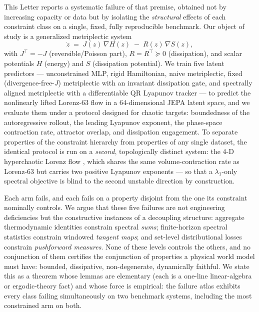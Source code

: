 \documentclass[journal]{IEEEtran}
\newcommand{\grad}{\nabla}
\begin{document}
This Letter reports a systematic failure of that premise, obtained not by
increasing capacity or data but by isolating the \emph{structural} effects
of each constraint class on a single, fixed, fully reproducible benchmark.
Our object of study is a generalized metriplectic system
\begin{equation}
\label{eq:metriplectic}
\dot z \;=\; J(z)\,\grad H(z) \;-\; R(z)\,\grad S(z),
\end{equation}
with $J^\top=-J$ (reversible/Poisson part), $R=R^\top\succeq 0$
(dissipation), and scalar potentials $H$ (energy) and $S$ (dissipation
potential). We train five latent predictors --- unconstrained MLP,
rigid Hamiltonian, naive metriplectic, fixed (divergence-free-$J$)
metriplectic with an invariant dissipation gate, and spectrally aligned
metriplectic with a differentiable QR Lyapunov tracker --- to predict the
nonlinearly lifted Lorenz-63 flow in a 64-dimensional JEPA latent space,
and we evaluate them under a protocol designed for chaotic targets:
boundedness of the autoregressive rollout, the leading Lyapunov exponent,
the phase-space contraction rate, attractor overlap, and dissipation
engagement. To separate properties of the constraint hierarchy from
properties of any single dataset, the identical protocol is run on a
\emph{second}, topologically distinct system: the 4-D hyperchaotic
Lorenz flow \cite{qi2008hyperchaos}, which shares the same
volume-contraction rate as Lorenz-63 but carries two positive Lyapunov
exponents --- so that a $\lambda_1$-only spectral objective is blind to
the second unstable direction by construction.

Each arm fails, and each fails on a property disjoint from the one its
constraint nominally controls. We argue that these five failures are not
engineering deficiencies but the constructive instances of a decoupling
structure: aggregate thermodynamic identities constrain spectral
\emph{sums}; finite-horizon spectral statistics constrain windowed
\emph{tangent maps}; and set-level distributional losses constrain
\emph{pushforward measures}. None of these levels controls the others,
and no conjunction of them certifies the conjunction of properties a
physical world model must have: {bounded, dissipative, non-degenerate,
dynamically faithful}. We state this as a theorem whose lemmas are
elementary (each is a one-line linear-algebra or ergodic-theory fact) and
whose force is empirical: the failure atlas exhibits every class failing
simultaneously on two benchmark systems, including the most constrained
arm on both.
\end{document}
